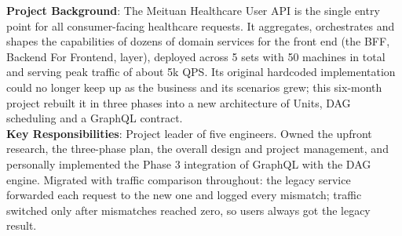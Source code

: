 \documentclass{resume}
\begin{document}

\textbf{Project Background}: The Meituan Healthcare User API is the single entry point for all consumer-facing healthcare requests. It aggregates, orchestrates and shapes the capabilities of dozens of domain services for the front end (the BFF, Backend For Frontend, layer), deployed across 5 sets with 50 machines in total and serving peak traffic of about 5k QPS. Its original hardcoded implementation could no longer keep up as the business and its scenarios grew; this six-month project rebuilt it in three phases into a new architecture of Units, DAG scheduling and a GraphQL contract.\\

\textbf{Key Responsibilities}: Project leader of five engineers. Owned the upfront research, the three-phase plan, the overall design and project management, and personally implemented the Phase 3 integration of GraphQL with the DAG engine. Migrated with traffic comparison throughout: the legacy service forwarded each request to the new one and logged every mismatch; traffic switched only after mismatches reached zero, so users always got the legacy result.\\
\end{document}
